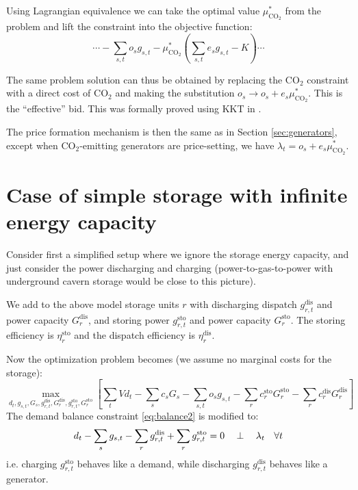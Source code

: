 \documentclass[final,3p,times]{elsarticle}
\def\l{\lambda} \def\K{\kappa} \def\m{\mu} \def\G{\Gamma} \def\d{\partial}
\begin{document}
Using Lagrangian equivalence we can take the optimal value
$\mu^*_{\textrm{CO}_2}$ from the problem and lift the constraint into the
objective function:
\begin{equation}
  \cdots -\sum_{s,t} o_s g_{s,t}   - \mu^*_{\textrm{CO}_2} \left(\sum_{s,t} e_s g_{s,t} - K \right) \cdots
\end{equation}


The same problem solution can thus be obtained by replacing the CO$_2$
constraint with a direct cost of CO$_2$ and making the substitution $o_s \to o_s
+ e_s \mu^*_{\textrm{CO}_2}$. This is the ``effective'' bid. This was formally
proved using KKT in \cite{Brown2020}.

The price formation mechanism is then the same as in Section
\ref{sec:generators}, except when CO$_2$-emitting generators are price-setting,
we have $\l_t = o_s + e_s \mu^*_{\textrm{CO}_2}$.



\section{Case of simple storage with infinite energy capacity}\label{sec:simple}

Consider first a simplified setup where we ignore the storage energy capacity,
and just consider the power discharging and charging (power-to-gas-to-power with
underground cavern storage would be close to this picture).

We add to the above model storage units $r$ with discharging dispatch
$g^{\textrm{dis}}_{r,t}$ and power capacity $G^{\textrm{dis}}_{r}$, and storing
power $g^{\textrm{sto}}_{r,t}$ and power capacity $G^{\textrm{sto}}_{r}$. The
storing efficiency is $\eta_r^{\textrm{sto}}$ and the dispatch efficiency is
$\eta_r^{\textrm{dis}}$.

Now the optimization problem becomes (we assume no marginal costs for the
storage):
\begin{equation}
  \max_{d_{t}, g_{s,t}, G_s,g^{\textrm{dis}}_{r,t},G^{\textrm{dis}}_{r},g^{\textrm{sto}}_{r,t},G^{\textrm{sto}}_{r}}\left[\sum_{t} Vd_{t} -  \sum_s c_s G_s - \sum_{s,t} o_{s} g_{s,t} -\sum_r c^{\textrm{sto}}_r G^{\textrm{sto}}_r -\sum_r c^{\textrm{dis}}_r G^{\textrm{dis}}_r\right]  \label{eq:objsr}
\end{equation}
The demand balance constraint \eqref{eq:balance2} is modified to:
\begin{align}
  d_{t} - \sum_s g_{s,t} - \sum_r g^{\textrm{dis}}_{r,t} + \sum_r g^{\textrm{sto}}_{r,t}  =  0 \hspace{0.34cm}\perp \hspace{0.34cm} \l_t \hspace{0.34cm} \forall t \label{eq:balance3}
\end{align}
i.e. charging $g^{\textrm{sto}}_{r,t}$ behaves like a demand, while discharging
$g^{\textrm{dis}}_{r,t}$ behaves like a generator.
\end{document}

